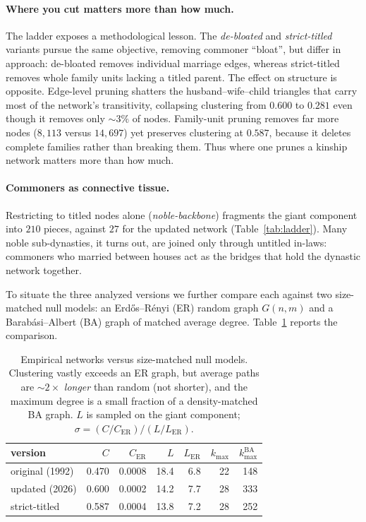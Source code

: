 \paragraph{Where you cut matters more than how much.}
The ladder exposes a methodological lesson. The \emph{de-bloated} and
\emph{strict-titled} variants pursue the same objective, removing commoner
``bloat'', but differ in approach: de-bloated removes individual
marriage edges, whereas strict-titled removes whole family units
lacking a titled parent. The effect on structure is opposite. Edge-level pruning
shatters the husband--wife--child triangles that carry most of the network's
transitivity, collapsing clustering from $0.600$ to $0.281$ even though it removes
only $\sim\!3\%$ of nodes. Family-unit pruning removes far more nodes
($8{,}113$ versus $14{,}697$) yet preserves clustering at $0.587$, because
it deletes complete families rather than breaking them. Thus where one
prunes a kinship network matters more than how much.

\paragraph{Commoners as connective tissue.}
Restricting to titled nodes alone (\emph{noble-backbone}) fragments the giant
component into $210$ pieces, against $27$ for the updated network
(Table~\ref{tab:ladder}). Many noble sub-dynasties, it turns out, are joined only
through untitled in-laws: commoners who married between houses act as the bridges
that hold the dynastic network together.

To situate the three analyzed versions we further compare each against two
size-matched null models: an Erd\H{o}s--R\'enyi (ER) random graph $G(n,m)$ and a
Barab\'asi--Albert (BA) graph of matched average degree. Table~\ref{tab:null}
reports the comparison.

\begin{table}[H]
\caption{Empirical networks versus size-matched null models. Clustering vastly
exceeds an ER graph, but average paths are $\sim\!2\times$ \emph{longer} than
random (not shorter), and the maximum degree is a small fraction of a
density-matched BA graph. $L$ is sampled on the giant component;
$\sigma=(C/C_{\mathrm{ER}})/(L/L_{\mathrm{ER}})$.}
\label{tab:null}
\centering\small
\begin{tabular}{lrrrrrr}
\toprule
version & $C$ & $C_{\mathrm{ER}}$ & $L$ & $L_{\mathrm{ER}}$ & $k_{\max}$ & $k_{\max}^{\mathrm{BA}}$ \\
\midrule
original (1992) & 0.470 & 0.0008 & 18.4 & 6.8 & 22 & 148 \\
updated (2026)  & 0.600 & 0.0002 & 14.2 & 7.7 & 28 & 333 \\
strict-titled   & 0.587 & 0.0004 & 13.8 & 7.2 & 28 & 252 \\
\bottomrule
\end{tabular}
\end{table}


